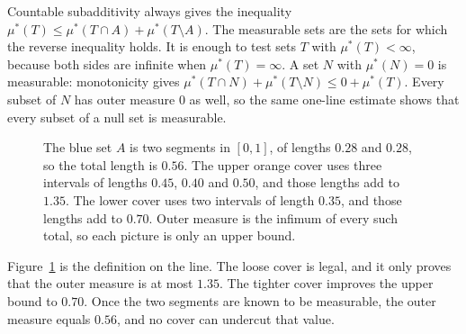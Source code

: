 Countable subadditivity always gives the inequality $\mu^*(T)\le\mu^*(T\cap A)+\mu^*(T\setminus A)$.
The measurable sets are the sets for which the reverse inequality holds.
It is enough to test sets $T$ with $\mu^*(T)<\infty$, because both sides are infinite when $\mu^*(T)=\infty$.
A set $N$ with $\mu^*(N)=0$ is measurable: monotonicity gives $\mu^*(T\cap N)+\mu^*(T\setminus N)\le0+\mu^*(T)$.
Every subset of $N$ has outer measure $0$ as well, so the same one-line estimate shows that every subset of a null set is measurable.

\begin{figure}[ht]
\centering
{}
\caption{The blue set $A$ is two segments in $[0,1]$, of lengths $0.28$ and $0.28$, so the total length is $0.56$.
The upper orange cover uses three intervals of lengths $0.45$, $0.40$ and $0.50$, and those lengths add to $1.35$.
The lower cover uses two intervals of length $0.35$, and those lengths add to $0.70$.
Outer measure is the infimum of every such total, so each picture is only an upper bound.}
\label{fig:rwintervals}
\end{figure}

Figure~\ref{fig:rwintervals} is the definition on the line.
The loose cover is legal, and it only proves that the outer measure is at most $1.35$.
The tighter cover improves the upper bound to $0.70$.
Once the two segments are known to be measurable, the outer measure equals $0.56$, and no cover can undercut that value.

